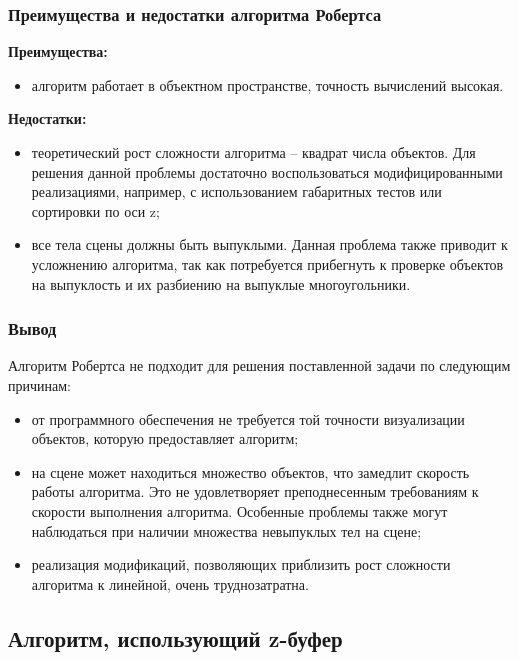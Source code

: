\documentclass[a4paper,14pt, unknownkeysallowed]{extreport}
\begin{document}
\subsubsection{Преимущества и недостатки алгоритма Робертса}

\textbf{Преимущества:}

\begin{itemize}
	\item алгоритм работает в объектном пространстве, точность вычислений высокая.
\end{itemize}

\textbf{Недостатки:}

\begin{itemize}
	\item теоретический рост сложности алгоритма -- квадрат числа объектов. Для решения данной проблемы достаточно воспользоваться модифицированными реализациями, например, с использованием габаритных тестов или сортировки по оси z;
	\item все тела сцены должны быть выпуклыми. Данная проблема также приводит к усложнению алгоритма, так как потребуется прибегнуть к проверке объектов на выпуклость и их разбиению на выпуклые многоугольники.
\end{itemize}

\subsubsection{Вывод}

Алгоритм Робертса не подходит для решения поставленной задачи по следующим причинам:

\begin{itemize}
	\item от программного обеспечения не требуется той точности визуализации объектов, которую предоставляет алгоритм;
	\item на сцене может находиться множество объектов, что замедлит скорость работы алгоритма. Это не удовлетворяет преподнесенным требованиям к скорости выполнения алгоритма. Особенные проблемы также могут наблюдаться при наличии множества невыпуклых тел на сцене;
	\item реализация модификаций, позволяющих приблизить рост сложности алгоритма к линейной, очень труднозатратна.
\end{itemize}

\subsection{Алгоритм, использующий z-буфер}
\end{document}
